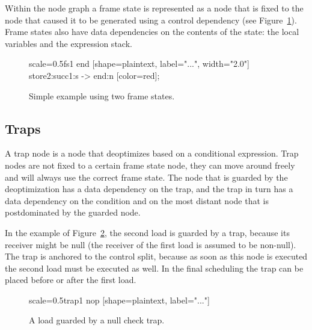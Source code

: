 \documentclass[twocolumn]{svjour3}
\begin{document}
Within the node graph a frame state is represented as a node that is fixed to the node that caused it to be generated using a control dependency (see Figure~\ref{fig:fs1}).
Frame states also have data dependencies on the contents of the state: the local variables and the expression stack.


\begin{figure}[h]
  \label{fig:fs1}
  \centering
\begin{digraphenv}{scale=0.5}{fs1}
    end [shape=plaintext, label="...", width="2.0"]
    store2:succ1:s -> end:n [color=red];
\end{digraphenv}
  \caption{Simple example using two frame states.}
\end{figure}


\subsection{Traps}
A trap node is a node that deoptimizes based on a conditional expression.
Trap nodes are not fixed to a certain frame state node, they can move around freely and will always use the correct frame state.
The node that is guarded by the deoptimization has a data dependency on the trap, and the trap in turn has a data dependency on the condition and on the most distant node that is postdominated by the guarded node.

In the example of Figure~\ref{fig:trap1}, the second load is guarded by a trap, because its receiver might be null (the receiver of the first load is assumed to be non-null).
The trap is anchored to the control split, because as soon as this node is executed the second load must be executed as well.
In the final scheduling the trap can be placed before or after the first load.

\begin{figure}[h]
  \label{fig:trap1}
  \centering
\begin{digraphenv}{scale=0.5}{trap1}
    nop [shape=plaintext, label="..."]
\end{digraphenv}
  \caption{A load guarded by a null check trap.}
\end{figure}
\end{document}
